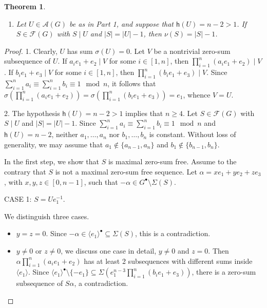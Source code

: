 \documentclass[a4paper, 10pt]{amsart}
\theoremstyle{plain}
\newtheorem{theorem}{\bf Theorem}[section]
\theoremstyle{definition}
\numberwithin{equation}{section}
\begin{document}
{\begin{theorem}
\begin{enumerate}
		\item Let $U \in \mathcal A (G)$ be as in Part 1, and suppose that  $\mathsf h(  U)=n-2>1$. If $S \in \mathcal F (G)$ with $S \mid U$ and $|S|=|U|-1$, then $\nu (S) = |S|-1$.
	\end{enumerate}
\end{theorem}

\begin{proof}
	1. Clearly, $U$ has sum $\sigma (U)=0$. Let $V$ be a nontrivial zero-sum subsequence of $U$. If $a_ie_1+e_2\mid V$ for some $i\in [1,n]$, then $\prod_{i=1}^n (a_ie_1+e_2)\mid V$. If $b_ie_1+e_3\mid V$ for some $i\in [1,n]$, then $\prod_{i=1}^n (b_ie_1+e_3)\mid V$. Since $\sum_{i=1}^n a_i \equiv \sum_{i=1}^n b_i \equiv 1 \mod{n}$, it follows that  $\sigma(\prod_{i=1}^n (a_ie_1+e_2))=\sigma(\prod_{i=1}^n (b_ie_1+e_3))=e_1$, whence $V=U$. 
	
	2. The hypothesis $\mathsf h(U)=n-2>1$ implies that $n\ge 4$. Let $S \in \mathcal F (G)$ with $S\mid U$ and $|S|=|U|-1$. Since $\sum_{i=1}^n a_i \equiv \sum_{i=1}^n b_i \equiv 1 \mod{n}$ and $\mathsf h(  U)=n-2$, neither $a_1,\ldots,a_n$ nor $b_1,\ldots,b_n$ is constant. Without loss of generality, we may assume that $a_1 \notin \{ a_{n-1}, a_n \}$ and $b_1 \notin  \{ b_{n-1}, b_n \}$.
	
	In the first step, we show that  $S$ is  maximal zero-sum free. Assume to the contrary that $S$ is not a maximal zero-sum free sequence. Let $\alpha=xe_1+ye_2+ze_3$, with $x,y,z \in [0, n-1]$, such that $-\alpha\in G^{\bullet}\setminus \Sigma (S)$. 
	
	\smallskip
	\noindent
	CASE 1: $S=Ue_1^{-1}$.
	
We distinguish three cases.
	\begin{itemize}
		\item[(i)] $y=z=0$. Since $-\alpha\in \langle e_1 \rangle^{\bullet} \subseteq  \Sigma (S)$, this is a contradiction.
		
		\item[(ii)] $y\ne 0$ or $z\ne 0$, we  discuss one case in detail, $y\ne 0$ and $z=0$. Then $\alpha \prod_{i=1}^n (a_ie_1+e_2)$ has at least 2 subsequences with different sums inside $\langle e_1 \rangle$. Since $\langle e_1 \rangle^{\bullet}\setminus\{-e_1\} \subseteq \Sigma (e_1^{n-3}\prod_{i=1}^n (b_ie_1+e_3))$, there is a zero-sum subsequence of $S\alpha$, a contradiction.
		

\end{itemize}
\end{proof}}
\end{document}
